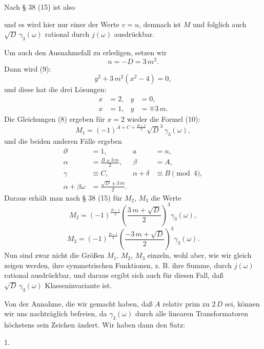 
Nach § 38 (15) ist also

und es wird hier nur einer der Werte $v = u$, demnach ist $M$
und folglich auch $\sqrt{D}\,\gamma_3(\omega)$ rational durch $j(\omega)$ ausdrückbar.

Um auch den Ausnahmefall zu erledigen, setzen wir
\[
n = -D = 3\,m^2.
\]
Dann wird (9):
\[
y^2 + 3\,m^2(x^2 - 4) = 0,
\]
und diese hat die drei Lösungen:
\[
\begin{aligned}
x &= 2, & y &= 0, \\
x &= 1, & y &= \mp 3\,m.
\end{aligned}
\]
Die Gleichungen (8) ergeben für $x = 2$ wieder die Formel (10):
\[
M_1 = (-1)^{A + C + \frac{B+1}{2}} \sqrt{D}^3\, \gamma_3(\omega),
\]
und die beiden anderen Fälle ergeben
\[
\begin{aligned}
\partial &= 1, & a &= n, \\
\alpha &= \frac{B \pm 3\,m}{2}, & \beta &= A, \\
\gamma &\equiv C, & \alpha + \delta &\equiv B \pmod{4}, \\
\alpha + \beta\omega &= \frac{\sqrt{D} \pm 3\,m}{2}. &&
\end{aligned}
\]
Daraus erhält man nach § 38 (15) für $M_2$, $M_3$ die Werte
\[
M_2 = (-1)^{\frac{B-1}{2}} \left(\frac{3\,m + \sqrt{D}}{2}\right)^3 \gamma_3(\omega),
\]
\[
M_3 = (-1)^{\frac{B-1}{2}} \left(\frac{-3\,m + \sqrt{D}}{2}\right)^3 \gamma_3(\omega).
\]
Nun sind zwar nicht die Größen $M_1$, $M_2$, $M_3$ einzeln, wohl
aber, wie wir gleich zeigen werden, ihre symmetrischen Funktionen, z. B. ihre Summe, durch $j(\omega)$ rational ausdrückbar, und
daraus ergibt sich auch für diesen Fall, daß $\sqrt{D}\,\gamma_3(\omega)$ Klasseninvariante ist.

Von der Annahme, die wir gemacht haben, daß $A$ relativ
prim zu $2\,D$ sei, können wir uns nachträglich befreien, da $\gamma_3(\omega)$
durch alle linearen Transformatoren höchstens sein Zeichen
ändert. Wir haben dann den Satz:

1. 
